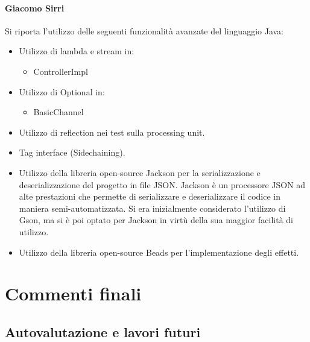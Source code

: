 \documentclass[a4paper,12pt]{report}
\begin{document}
\subsubsection{Giacomo Sirri}
Si riporta l’utilizzo delle seguenti funzionalità avanzate del linguaggio Java:
\begin{itemize}
    \item Utilizzo di lambda e stream in:
    \begin{itemize}
        \item ControllerImpl
    \end{itemize}
    \item Utilizzo di Optional in:
    \begin{itemize}
        \item BasicChannel
    \end{itemize}
    \item Utilizzo di reflection nei test sulla processing unit.
    \item Tag interface (Sidechaining).
    \item Utilizzo della libreria open-source Jackson per la serializzazione e deserializzazione del progetto in file JSON. Jackson è un processore JSON ad alte prestazioni che permette di serializzare e deserializzare il codice in maniera semi-automatizzata. Si era inizialmente considerato l’utilizzo di Gson, ma si è poi optato per Jackson in virtù della sua maggior facilità di utilizzo.
    \item Utilizzo della libreria open-source Beads per l’implementazione degli effetti.
\end{itemize}
\endsubsubsection
\endsubsection
\endsection

\chapter{Commenti finali}
\section{Autovalutazione e lavori futuri}
\end{document}
